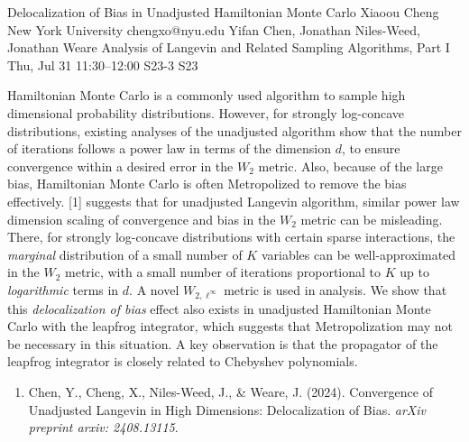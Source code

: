 \documentclass[12pt,lettersize,oneside]{book} %
\begin{document}
\begin{talk}
  {Delocalization of Bias in Unadjusted Hamiltonian Monte Carlo}%
  {Xiaoou Cheng}%
  {New York University}%
  {chengxo@nyu.edu}%
  {Yifan Chen, Jonathan Niles-Weed, Jonathan Weare}%
  {Analysis of Langevin and Related Sampling Algorithms, Part I}%
  {Thu, Jul 31 11:30--12:00}%
  {S23-3}%
  {S23}%
    
   
Hamiltonian Monte Carlo is a commonly used algorithm to sample high dimensional probability distributions. However, for strongly log-concave distributions, existing analyses of the unadjusted algorithm show that the number of iterations follows a power law in terms of the dimension $d$, to ensure convergence within a desired error in the $W_2$ metric. Also, because of the large bias, Hamiltonian Monte Carlo is often Metropolized to remove the bias effectively. [1] suggests that for unadjusted Langevin algorithm, similar power law dimension scaling of convergence and bias in the $W_2$ metric can be misleading. There, for strongly log-concave distributions with certain sparse interactions, the \emph{marginal} distribution of a small number of $K$ variables can be well-approximated in the $W_2$ metric, with a small number of iterations proportional to $K$ up to \emph{logarithmic} terms in $d$. A novel $W_{2,\ell^\infty}$ metric is used in analysis. We show that this \emph{delocalization of bias} effect also exists in unadjusted Hamiltonian Monte Carlo with the leapfrog integrator, which suggests that Metropolization may not be necessary in this situation. A key observation is that the propagator of the leapfrog integrator is closely related to Chebyshev polynomials.

\medskip

\begin{enumerate}
 \item[{[1]}] Chen, Y., Cheng, X., Niles-Weed, J., \& Weare, J. (2024). Convergence of Unadjusted Langevin in High Dimensions: Delocalization of Bias. \textit{arXiv preprint arxiv: 2408.13115}.
\end{enumerate}

\end{talk}
\end{document}
